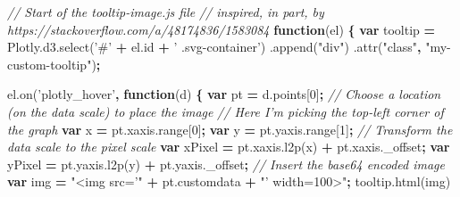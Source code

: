 \documentclass[
  12pt,
]{krantz}
\newenvironment{Shaded}{\begin{snugshade}}{\end{snugshade}}
\newcommand{\AttributeTok}[1]{\textcolor[rgb]{0.77,0.63,0.00}{#1}}
\newcommand{\CommentTok}[1]{\textcolor[rgb]{0.56,0.35,0.01}{\textit{#1}}}
\newcommand{\DecValTok}[1]{\textcolor[rgb]{0.00,0.00,0.81}{#1}}
\newcommand{\KeywordTok}[1]{\textcolor[rgb]{0.13,0.29,0.53}{\textbf{#1}}}
\newcommand{\NormalTok}[1]{#1}
\newcommand{\OperatorTok}[1]{\textcolor[rgb]{0.81,0.36,0.00}{\textbf{#1}}}
\newcommand{\StringTok}[1]{\textcolor[rgb]{0.31,0.60,0.02}{#1}}
\newcommand{\VariableTok}[1]{\textcolor[rgb]{0.00,0.00,0.00}{#1}}
\begin{document}
\begin{Shaded}
\begin{Highlighting}[]
\CommentTok{// Start of the tooltip-image.js file}
\CommentTok{// inspired, in part, by https://stackoverflow.com/a/48174836/1583084}
\KeywordTok{function}\NormalTok{(el) }\OperatorTok{\{}
  \KeywordTok{var}\NormalTok{ tooltip }\OperatorTok{=} \VariableTok{Plotly}\NormalTok{.}\VariableTok{d3}\NormalTok{.}\AttributeTok{select}\NormalTok{(}\StringTok{'#'} \OperatorTok{+} \VariableTok{el}\NormalTok{.}\AttributeTok{id} \OperatorTok{+} \StringTok{' .svg-container'}\NormalTok{)}
\NormalTok{    .}\AttributeTok{append}\NormalTok{(}\StringTok{"div"}\NormalTok{)}
\NormalTok{    .}\AttributeTok{attr}\NormalTok{(}\StringTok{"class"}\OperatorTok{,} \StringTok{"my-custom-tooltip"}\NormalTok{)}\OperatorTok{;}

  \VariableTok{el}\NormalTok{.}\AttributeTok{on}\NormalTok{(}\StringTok{'plotly_hover'}\OperatorTok{,} \KeywordTok{function}\NormalTok{(d) }\OperatorTok{\{}
    \KeywordTok{var}\NormalTok{ pt }\OperatorTok{=} \VariableTok{d}\NormalTok{.}\AttributeTok{points}\NormalTok{[}\DecValTok{0}\NormalTok{]}\OperatorTok{;}
    \CommentTok{// Choose a location (on the data scale) to place the image}
    \CommentTok{// Here I'm picking the top-left corner of the graph}
    \KeywordTok{var}\NormalTok{ x }\OperatorTok{=} \VariableTok{pt}\NormalTok{.}\VariableTok{xaxis}\NormalTok{.}\AttributeTok{range}\NormalTok{[}\DecValTok{0}\NormalTok{]}\OperatorTok{;}
    \KeywordTok{var}\NormalTok{ y }\OperatorTok{=} \VariableTok{pt}\NormalTok{.}\VariableTok{yaxis}\NormalTok{.}\AttributeTok{range}\NormalTok{[}\DecValTok{1}\NormalTok{]}\OperatorTok{;}
    \CommentTok{// Transform the data scale to the pixel scale}
    \KeywordTok{var}\NormalTok{ xPixel }\OperatorTok{=} \VariableTok{pt}\NormalTok{.}\VariableTok{xaxis}\NormalTok{.}\AttributeTok{l2p}\NormalTok{(x) }\OperatorTok{+} \VariableTok{pt}\NormalTok{.}\VariableTok{xaxis}\NormalTok{.}\AttributeTok{_offset}\OperatorTok{;}
    \KeywordTok{var}\NormalTok{ yPixel }\OperatorTok{=} \VariableTok{pt}\NormalTok{.}\VariableTok{yaxis}\NormalTok{.}\AttributeTok{l2p}\NormalTok{(y) }\OperatorTok{+} \VariableTok{pt}\NormalTok{.}\VariableTok{yaxis}\NormalTok{.}\AttributeTok{_offset}\OperatorTok{;}
    \CommentTok{// Insert the base64 encoded image}
    \KeywordTok{var}\NormalTok{ img }\OperatorTok{=} \StringTok{"<img src='"} \OperatorTok{+}  \VariableTok{pt}\NormalTok{.}\AttributeTok{customdata} \OperatorTok{+} \StringTok{"' width=100>"}\OperatorTok{;}
    \VariableTok{tooltip}\NormalTok{.}\AttributeTok{html}\NormalTok{(img)}

\end{Highlighting}
\end{Shaded}
\end{document}
